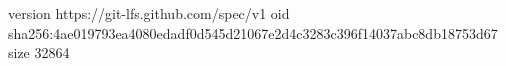 version https://git-lfs.github.com/spec/v1
oid sha256:4ae019793ea4080edadf0d545d21067e2d4c3283c396f14037abc8db18753d67
size 32864
